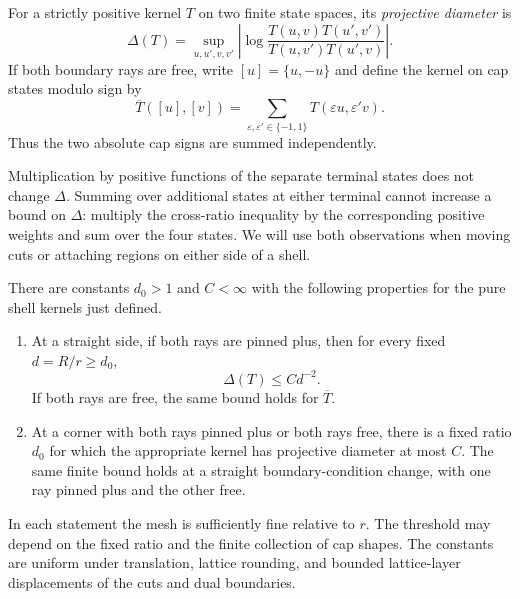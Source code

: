 \begin{definition}
For a strictly positive kernel $T$ on two finite state spaces, its
\emph{projective diameter} is
\begin{equation}
 \Delta(T)=\sup_{u,u',v,v'}
 \left|\log\frac{T(u,v)T(u',v')}{T(u,v')T(u',v)}\right|.
 \label{eq:projective-diameter}
\end{equation}
If both boundary rays are free, write $[u]=\{u,-u\}$ and define the
kernel on cap states modulo sign by
\begin{equation}
 \overline T([u],[v])
   =\sum_{\varepsilon,\varepsilon'\in\{-1,1\}}
       T(\varepsilon u,\varepsilon'v).
 \label{eq:quotient-shell-kernel}
\end{equation}
Thus the two absolute cap signs are summed independently.
\end{definition}

Multiplication by positive functions of the separate terminal states
does not change $\Delta$. Summing over additional states at either
terminal cannot increase a bound on $\Delta$: multiply the cross-ratio
inequality by the corresponding positive weights and sum over the four
states. We will use both observations when moving cuts or attaching
regions on either side of a shell.

\begin{lemma}
\label{lem:boundary-transfer}
There are constants $d_0>1$ and $C<\infty$ with the following properties
for the pure shell kernels just defined.
\begin{enumerate}
\item At a straight side, if both rays are pinned plus, then for every
fixed $d=R/r\ge d_0$,
\begin{equation}
                  \Delta(T)\le C d^{-2}.
 \label{eq:straight-boundary-transfer}
\end{equation}
If both rays are free, the same bound holds for $\overline T$.
\item At a corner with both rays pinned plus or both rays free, there
is a fixed ratio $d_0$ for which the appropriate kernel has projective
diameter at most $C$. The same finite bound holds at a straight
boundary-condition change, with one ray pinned plus and the other free.
\end{enumerate}
In each statement the mesh is sufficiently fine relative to $r$.
The threshold may depend on the fixed ratio and the finite collection
of cap shapes. The constants are uniform under translation, lattice
rounding, and bounded lattice-layer displacements of the cuts and dual
boundaries.
\end{lemma}

